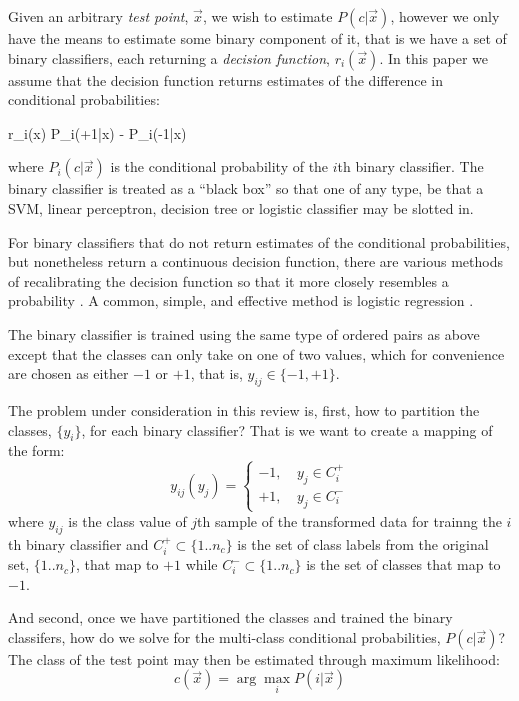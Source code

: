 Given an arbitrary {\it test point}, $\vec x$, 
we wish to estimate $P(c | \vec x)$, however we only have
the means to estimate some binary component of it, that is we have a 
set of binary classifiers, 
each returning a {\it decision function}, $r_i(\vec x)$.
In this paper we assume that the decision function 
returns estimates of the difference in conditional probabilities:
\begin{eqnnon}
	r_i(\vec x) \approx P_i(+1|\vec x) - P_i(-1|\vec x)
\end{eqnnon}
where $P_i(c|\vec x)$ is the conditional probability of the $i$th
binary classifier.
The binary classifier is treated as a ``black box'' so that one of any type,
be that a SVM, linear perceptron, decision tree or logistic classifier may be 
slotted in.

For binary classifiers that do not return estimates of the conditional
probabilities, but nonetheless return a continuous decision function,
there are various methods of recalibrating the decision function
so that it more closely resembles a probability 
\citep{Zadrozny_Elkan2002,Jolliffe_Stephenson2003,Niculescu_Caruana2005}.
A common, simple, and effective method is logistic regression \citep{Platt1999}.

The binary classifier is trained using the same type of ordered pairs as
above except that the classes can only take on one of two values,
which for convenience are chosen as either $-1$ or $+1$, 
that is, $y_{ij} \in \lbrace -1, +1 \rbrace$.

The problem under consideration in this review is, first,
how to partition the classes, $\lbrace y_i \rbrace$, for each binary classifier?
That is we want to create a mapping of the form:
\begin{equation}
	y_{ij} (y_j) = \left \lbrace  \begin{array}{lr}
-1, & ~ y_j \in C_i^+ \\
+1, & ~ y_j \in C_i^-
\end{array}
	\right . \label{mapping}
\end{equation}
where $y_{ij}$ is the class value of $j$th sample of the transformed data 
for trainng the $i$th binary classifier and 
$C_i^+ \subset \lbrace 1..n_c \rbrace$ is the set of class labels from the original set,
$\lbrace 1..n_c \rbrace$, that map to $+1$ while
$C_i^- \subset \lbrace 1..n_c \rbrace$ is the set of classes that map to $-1$.

And second, once we have partitioned the classes
and trained the binary classifers,
how do we solve for the multi-class conditional probabilities, $P(c|\vec x)$?
The class of the test point may then be estimated through maximum likelihood:
\begin{equation}
	c(\vec x)=\arg \max_i P(i | \vec x)
	\label{maximum_likelihood}
\end{equation}

